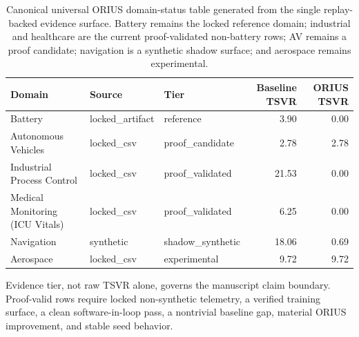 \begin{table}[htbp]
\centering
\caption{Canonical universal ORIUS domain-status table generated from the
single replay-backed evidence surface. Battery remains the locked reference
domain; industrial and healthcare are the current proof-validated
non-battery rows; AV remains a proof candidate; navigation is a
synthetic shadow surface; and aerospace remains experimental.}
\label{tab:domain-validation-summary}
\begin{tabular}{lllr r}
\toprule
Domain & Source & Tier & Baseline TSVR & ORIUS TSVR \\
\midrule
Battery & locked\_artifact & reference & 3.90 & 0.00 \\
Autonomous Vehicles & locked\_csv & proof\_candidate & 2.78 & 2.78 \\
Industrial Process Control & locked\_csv & proof\_validated & 21.53 & 0.00 \\
Medical Monitoring (ICU Vitals) & locked\_csv & proof\_validated & 6.25 & 0.00 \\
Navigation & synthetic & shadow\_synthetic & 18.06 & 0.69 \\
Aerospace & locked\_csv & experimental & 9.72 & 9.72 \\
\bottomrule
\end{tabular}
\smallskip
\begin{minipage}{0.95\linewidth}\footnotesize
Evidence tier, not raw TSVR alone, governs the manuscript claim boundary.
Proof-valid rows require locked non-synthetic telemetry, a verified
training surface, a clean software-in-loop pass, a nontrivial baseline
gap, material ORIUS improvement, and stable seed behavior.
\end{minipage}
\end{table}
